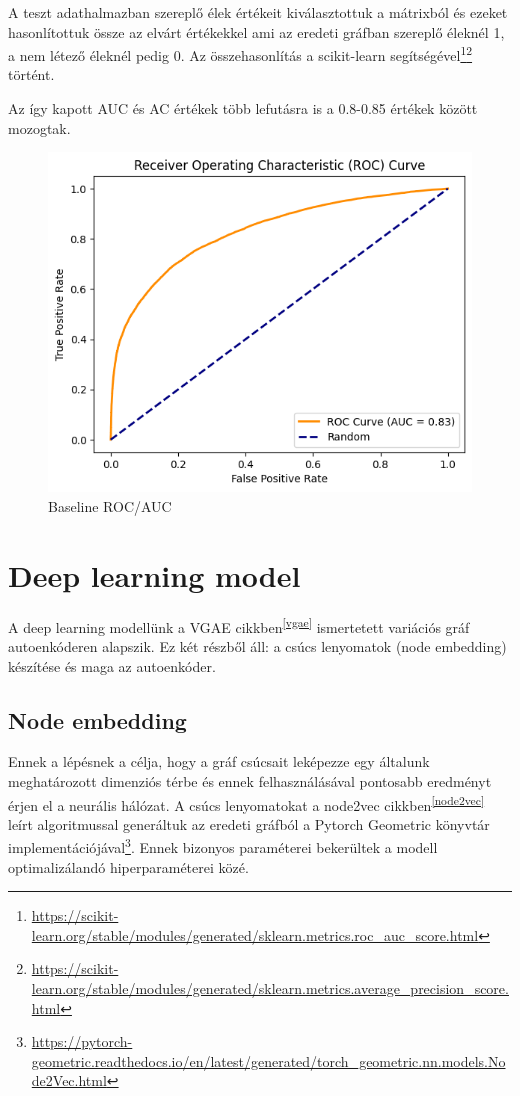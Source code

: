 \documentclass{article}
\begin{document}
		\par A teszt adathalmazban szereplő élek értékeit kiválasztottuk a mátrixból és ezeket hasonlítottuk össze az elvárt értékekkel ami az eredeti gráfban szereplő éleknél 1, a nem létező éleknél pedig 0. Az összehasonlítás a scikit-learn segítségével\footnote{\url{https://scikit-learn.org/stable/modules/generated/sklearn.metrics.roc_auc_score.html}}\footnote{\url{https://scikit-learn.org/stable/modules/generated/sklearn.metrics.average_precision_score.html}} történt.
		
		\par Az így kapott AUC és AC értékek több lefutásra is a 0.8-0.85 értékek között mozogtak.
		
		\begin{figure}[H]
			\centering
			\includegraphics[width=0.6\linewidth]{Figures/baseline_roc_auc.png}
			\caption{Baseline ROC/AUC}
		\end{figure}
	
	\section{Deep learning model}
	
		\par A deep learning modellünk a VGAE cikkben\textsuperscript{\ref{vgae}} ismertetett variációs gráf autoenkóderen alapszik. Ez két részből áll: a csúcs lenyomatok (node embedding) készítése és maga az autoenkóder.
		
		\subsection{Node embedding}
			
			\par Ennek a lépésnek a célja, hogy a gráf csúcsait leképezze egy általunk meghatározott dimenziós térbe és ennek felhasználásával pontosabb eredményt érjen el a neurális hálózat. A csúcs lenyomatokat a node2vec cikkben\textsuperscript{\ref{node2vec}} leírt algoritmussal generáltuk az eredeti gráfból a Pytorch Geometric könyvtár implementációjával\footnote{\url{https://pytorch-geometric.readthedocs.io/en/latest/generated/torch_geometric.nn.models.Node2Vec.html}}. Ennek bizonyos paraméterei bekerültek a modell optimalizálandó hiperparaméterei közé.
			
\end{document}
